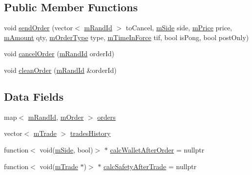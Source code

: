 \subsection*{Public Member Functions}
\begin{DoxyCompactItemize}
\item 
void \hyperlink{class_k_1_1_o_g_a1abe610a042782fc064f909adf519013}{send\+Order} (vector$<$ \hyperlink{km_8h_a23233b27e494114073abc4d494b05626}{m\+Rand\+Id} $>$ to\+Cancel, \hyperlink{namespace_k_a0b7d0fa0ffc9f87da1d6499cbcee7e94}{m\+Side} side, \hyperlink{km_8h_a392f9b7f384aa3539bbb890b059f5b8c}{m\+Price} price, \hyperlink{km_8h_ad4d00888c55a47a8a40ed8020d176086}{m\+Amount} qty, \hyperlink{namespace_k_a131435180aff10fab1bf3da09af62b0d}{m\+Order\+Type} type, \hyperlink{namespace_k_a290fccb3fc7d447fdbb93a61f6dfba44}{m\+Time\+In\+Force} tif, bool is\+Pong, bool post\+Only)
\item 
void \hyperlink{class_k_1_1_o_g_a9b8d071fe7202c65f78901a02a1e04d6}{cancel\+Order} (\hyperlink{km_8h_a23233b27e494114073abc4d494b05626}{m\+Rand\+Id} order\+Id)
\item 
void \hyperlink{class_k_1_1_o_g_ab503bb642cb730d5be83e54c16a6e7e7}{clean\+Order} (\hyperlink{km_8h_a23233b27e494114073abc4d494b05626}{m\+Rand\+Id} \&order\+Id)
\end{DoxyCompactItemize}
\subsection*{Data Fields}
\begin{DoxyCompactItemize}
\item 
map$<$ \hyperlink{km_8h_a23233b27e494114073abc4d494b05626}{m\+Rand\+Id}, \hyperlink{struct_k_1_1m_order}{m\+Order} $>$ \hyperlink{class_k_1_1_o_g_a3edc39f2b61ed046bfac9414042e54c4}{orders}
\item 
vector$<$ \hyperlink{struct_k_1_1m_trade}{m\+Trade} $>$ \hyperlink{class_k_1_1_o_g_a4b64cd03cacdbed4ca7d0b7151546441}{trades\+History}
\item 
function$<$ void(\hyperlink{namespace_k_a0b7d0fa0ffc9f87da1d6499cbcee7e94}{m\+Side}, bool)$>$ $\ast$ \hyperlink{class_k_1_1_o_g_a61416b97cde02a422eb91f3d29ef346f}{calc\+Wallet\+After\+Order} = nullptr
\item 
function$<$ void(\hyperlink{struct_k_1_1m_trade}{m\+Trade} $\ast$)$>$ $\ast$ \hyperlink{class_k_1_1_o_g_a58a0b5975f3806226227956a06f57432}{calc\+Safety\+After\+Trade} = nullptr
\end{DoxyCompactItemize}
